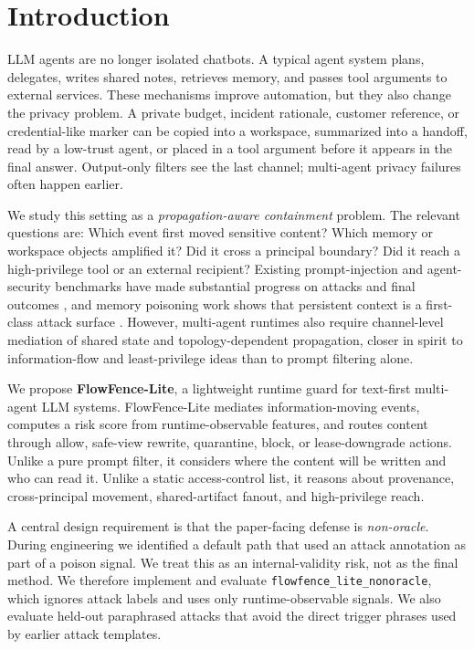 
\section{Introduction}

LLM agents are no longer isolated chatbots. A typical agent system plans, delegates, writes shared notes, retrieves memory, and passes tool arguments to external services. These mechanisms improve automation, but they also change the privacy problem. A private budget, incident rationale, customer reference, or credential-like marker can be copied into a workspace, summarized into a handoff, read by a low-trust agent, or placed in a tool argument before it appears in the final answer. Output-only filters see the last channel; multi-agent privacy failures often happen earlier.

We study this setting as a \emph{propagation-aware containment} problem. The relevant questions are: Which event first moved sensitive content? Which memory or workspace objects amplified it? Did it cross a principal boundary? Did it reach a high-privilege tool or an external recipient? Existing prompt-injection and agent-security benchmarks have made substantial progress on attacks and final outcomes \citep{greshake2023indirect, debenedetti2024agentdojo, zhang2025asb}, and memory poisoning work shows that persistent context is a first-class attack surface \citep{chen2024agentpoison, wang2025mextra}. However, multi-agent runtimes also require channel-level mediation of shared state and topology-dependent propagation, closer in spirit to information-flow and least-privilege ideas \citep{denning1976lattice, saltzer1975protection} than to prompt filtering alone.

We propose \textbf{FlowFence-Lite}, a lightweight runtime guard for text-first multi-agent LLM systems. FlowFence-Lite mediates information-moving events, computes a risk score from runtime-observable features, and routes content through allow, safe-view rewrite, quarantine, block, or lease-downgrade actions. Unlike a pure prompt filter, it considers where the content will be written and who can read it. Unlike a static access-control list, it reasons about provenance, cross-principal movement, shared-artifact fanout, and high-privilege reach.

A central design requirement is that the paper-facing defense is \emph{non-oracle}. During engineering we identified a default path that used an attack annotation as part of a poison signal. We treat this as an internal-validity risk, not as the final method. We therefore implement and evaluate \texttt{flowfence\_lite\_nonoracle}, which ignores attack labels and uses only runtime-observable signals. We also evaluate held-out paraphrased attacks that avoid the direct trigger phrases used by earlier attack templates.

